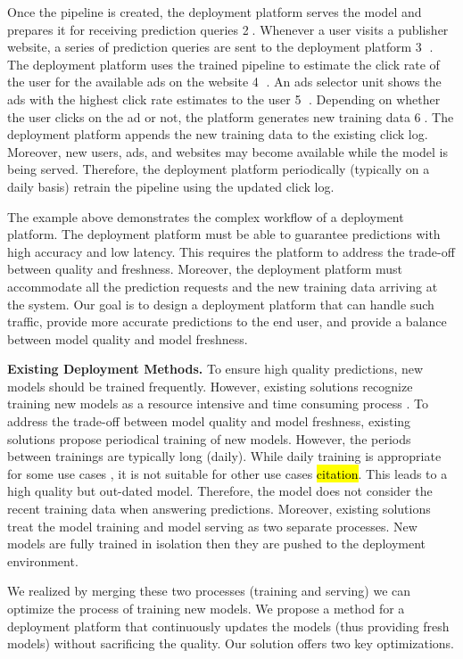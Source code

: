 Once the pipeline is created, the deployment platform serves the model and prepares it for receiving prediction queries \textcircled{2}.
Whenever a user visits a publisher website, a series of prediction queries are sent to the deployment platform \textcircled{3} .
The deployment platform uses the trained pipeline to estimate the click rate of the user for the available ads on the website \textcircled{4} .
An ads selector unit shows the ads with the highest click rate estimates to the user \textcircled{5} .
Depending on whether the user clicks on the ad or not, the platform generates new training data \textcircled{6}.
The deployment platform appends the new training data to the existing click log.
Moreover, new users, ads, and websites may become available while the model is being served.
Therefore, the deployment platform periodically (typically on a daily basis) retrain the pipeline using the updated click log.

The example above demonstrates the complex workflow of a deployment platform.
The deployment platform must be able to guarantee predictions with high accuracy and low latency.
This requires the platform to address the trade-off between quality and freshness.
Moreover, the deployment platform must accommodate all the prediction requests and the new training data arriving at the system. 
Our goal is to design a deployment platform that can handle such traffic, provide more accurate predictions to the end user, and provide a balance between model quality and model freshness.

\textbf{Existing Deployment Methods.} 
To ensure high quality predictions, new models should be trained frequently.
However, existing solutions recognize training new models as a resource intensive and time consuming process \cite{crankshaw2014missing, agarwal2014laser, baylor2017tfx}.
To address the trade-off between model quality and model freshness, existing solutions propose periodical training of new models.
However, the periods between trainings are typically long (daily).
While daily training is appropriate for some use cases \cite{baylor2017tfx}, it is not suitable for other use cases \hl{citation}.
This leads to a high quality but out-dated model.
Therefore, the model does not consider the recent training data when answering predictions.
Moreover, existing solutions treat the model training and model serving as two separate processes. 
New models are fully trained in isolation then they are pushed to the deployment environment.

We realized by merging these two processes (training and serving) we can optimize the process of training new models.
We propose a method for a deployment platform that continuously updates the models (thus providing fresh models) without sacrificing the quality.
Our solution offers two key optimizations.

